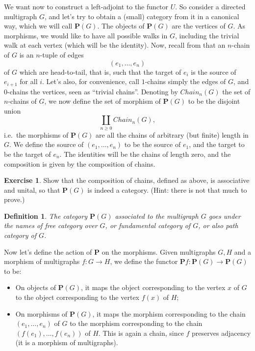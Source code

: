 \documentclass[12pt,oneside]{scrbook}
\numberwithin{equation}{section}
\theoremstyle{plain}
\newtheorem{deph}[thm]{Definition}
\theoremstyle{definition}
\newtheorem{ex}[thm]{Exercise}
\newcommand{\cat}[1]{{\mathbf{#1}}} %
\DeclareMathOperator{\1}{\mathbbm{1}}
\DeclareMathOperator{\2}{\mathbbm{2}}
\begin{document}
We want now to construct a left-adjoint to the functor $U$. So consider a directed multigraph $G$, and let's try to obtain a (small) category from it in a canonical way, which we will call $\cat{P}(G)$. The objects of $\cat{P}(G)$ are the vertices of $G$. As morphisms, we would like to have all possible walks in $G$, including the trivial walk at each vertex (which will be the identity). Now, recall from  that an $n$-chain of $G$ is an $n$-tuple of edges 
$$
(e_1,\dots,e_n)
$$ 
of $G$ which are head-to-tail, that is, such that the target of $e_i$ is the source of $e_{i+1}$ for all $i$. Let's also, for convenience, call $1$-chains simply the edges of $G$, and $0$-chains the vertices, seen as ``trivial chains''. Denoting by $\mathit{Chain}_n(G)$ the set of $n$-chains of $G$, we now define the set of morphism of $\cat{P}(G)$ to be the disjoint union
$$
\coprod_{n\ge 0} \mathit{Chain}_n(G) ,
$$
i.e.~the morphisms of $\cat{P}(G)$ are all the chains of arbitrary (but finite) length in $G$. We define the source of $(e_1,\dots,e_n)$ to be the source of $e_1$, and the target to be the target of $e_n$. The identities will be the chains of length zero, and the composition is given by the composition of chains. 

\begin{ex}
 Show that the composition of chains, defined as above, is associative and unital, so that $\cat{P}(G)$ is indeed a category. (Hint: there is not that much to prove.)
\end{ex}

\begin{deph}
 The category $\cat{P}(G)$ associated to the multigraph $G$ goes under the names of \emph{free category over $G$}, or \emph{fundamental category of $G$}, or also \emph{path category of $G$}. 
\end{deph}


Now let's define the action of $\cat{P}$ on the morphisms. Given multigraphs $G,H$ and a morphism of multigraphs $f:G\to H$, we define the functor $\cat{P}f:\cat{P}(G)\to\cat{P}(G)$ to be:
\begin{itemize}
 \item On objects of $\cat{P}(G)$, it maps the object corresponding to the vertex $x$ of $G$ to the object corresponding to the vertex $f(x)$ of $H$;
 \item On morphisms of $\cat{P}(G)$, it maps the morphism corresponding to the chain $(e_1,\dots,e_n)$ of $G$ to the morphism corresponding to the chain $(f(e_1),\dots,f(e_n))$ of $H$. This is again a chain, since $f$ preserves adjacency (it is a morphism of multigraphs).
\end{itemize}
\end{document}
